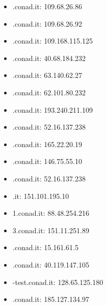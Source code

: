 \documentclass{article}
\begin{document}
\begin{itemize}
    
        \item \textbfadmin.conad.it: 109.68.26.86
    
        \item \textbfaltuoservizio.conad.it: 109.68.26.92
    
        \item \textbfamicheperlapelle.conad.it: 109.168.115.125
    
        \item \textbfamicocalendario.conad.it: 40.68.184.232
    
        \item \textbfanalytics.conad.it: 63.140.62.27
    
        \item \textbfapriamoleporte.conad.it: 62.101.80.232
    
        \item \textbfbackupinsiemeperlascuola.conad.it: 193.240.211.109
    
        \item \textbfbonusbolletta.conad.it: 52.16.137.238
    
        \item \textbfbuonepratiche.conad.it: 165.22.20.19
    
        \item \textbfchisiamo.conad.it: 146.75.55.10
    
        \item \textbfclubfamiglia.conad.it: 52.16.137.238
    
        \item \textbfconad.it: 151.101.195.10
    
        \item \textbfconadrad1.conad.it: 88.48.254.216
    
        \item \textbfconadrad3.conad.it: 151.11.251.89
    
        \item \textbfconcorsoversonatura.conad.it: 15.161.61.5
    
        \item \textbfcrm.conad.it: 40.119.147.105
    
        \item \textbfdigitalroom-test.conad.it: 128.65.125.180
    
        \item \textbfdigitalroom.conad.it: 185.127.134.97
    

\end{itemize}
\end{document}
